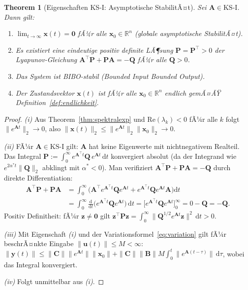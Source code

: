 ﻿\documentclass[12pt, a4paper, titlepage]{report}
\newtheorem{theorem}{Theorem}[section]
\theoremstyle{definition}
\theoremstyle{remark}
\newcommand{\R}{\mathbb{R}}
\newcommand{\vx}{\bm{x}}
\newcommand{\vu}{\bm{u}}
\newcommand{\vy}{\bm{y}}
\newcommand{\vA}{\bm{A}}
\newcommand{\vB}{\bm{B}}
\newcommand{\vC}{\bm{C}}
\newcommand{\vP}{\bm{P}}
\newcommand{\vQ}{\bm{Q}}
\newcommand{\T}{\top}
\newcommand{\re}{\mathrm{Re}}
\newcommand{\KS}{\mathrm{KS}}
\begin{document}
\begin{theorem}[Eigenschaften KS-I: Asymptotische StabilitÃ¤t]
\label{thm:ks1}
Sei $\vA \in \KS\text{-I}$. Dann gilt:
\begin{enumerate}[label=(\roman*)]
  \item $\lim_{t\to\infty}\vx(t) = \bm{0}$ fÃ¼r alle $\vx_0 \in \R^n$
    (globale asymptotische StabilitÃ¤t).
  \item Es existiert eine eindeutige positiv definite LÃ¶sung $\vP = \vP^\T > 0$
    der Lyapunov-Gleichung $\vA^\T\vP + \vP\vA = -\vQ$ fÃ¼r alle $\vQ > 0$.
  \item Das System ist BIBO-stabil (Bounded Input Bounded Output).
  \item Der Zustandsvektor $\vx(t)$ ist fÃ¼r alle $\vx_0 \in \R^n$ endlich
    gemÃ¤ÃŸ Definition~\ref{def:endlichkeit}.
\end{enumerate}
\end{theorem}

\begin{proof}
\textit{(i)} Aus Theorem~\ref{thm:spektralexp} und $\re(\lambda_k) < 0$ fÃ¼r alle $k$
folgt $\|e^{\vA t}\|_2 \to 0$, also $\|\vx(t)\|_2 \leq \|e^{\vA t}\|_2 \|\vx_0\|_2 \to 0$.

\textit{(ii)} FÃ¼r $\vA \in \KS\text{-I}$ gilt: $\vA$ hat keine Eigenwerte mit
nichtnegativem Realteil. Das Integral
$\vP := \int_0^\infty e^{\vA^\T t}\vQ\,e^{\vA t}\,\mathrm{d}t$
konvergiert absolut (da der Integrand wie $e^{2\alpha^* t}\|\vQ\|_2$ abklingt mit
$\alpha^* < 0$). Man verifiziert $\vA^\T\vP + \vP\vA = -\vQ$ durch direkte Differentiation:
\begin{align*}
  \vA^\T\vP + \vP\vA &= \int_0^\infty \bigl(\vA^\T e^{\vA^\T t}\vQ e^{\vA t} + e^{\vA^\T t}\vQ e^{\vA t}\vA\bigr)\mathrm{d}t \\
  &= \int_0^\infty \frac{\mathrm{d}}{\mathrm{d}t}\bigl(e^{\vA^\T t}\vQ e^{\vA t}\bigr)\,\mathrm{d}t
   = \bigl[e^{\vA^\T t}\vQ e^{\vA t}\bigr]_0^\infty = 0 - \vQ = -\vQ.
\end{align*}
Positiv Definitheit: fÃ¼r $\bm{z} \neq \bm{0}$ gilt
$\bm{z}^\T\vP\bm{z} = \int_0^\infty \|{\vQ}^{1/2}e^{\vA t}\bm{z}\|^2\,\mathrm{d}t > 0$.

\textit{(iii)} Mit Eigenschaft \textit{(i)} und der Variationsformel~\eqref{eq:variation}
gilt fÃ¼r beschrÃ¤nkte Eingabe $\|\vu(t)\| \leq M < \infty$:
$\|\vy(t)\| \leq \|\vC\|\|e^{\vA t}\|\|\vx_0\| + \|\vC\|\|\vB\| M \int_0^t \|e^{\vA(t-\tau)}\|\,\mathrm{d}\tau$,
wobei das Integral konvergiert.

\textit{(iv)} Folgt unmittelbar aus \textit{(i)}. \qedhere
\end{proof}
\end{document}
